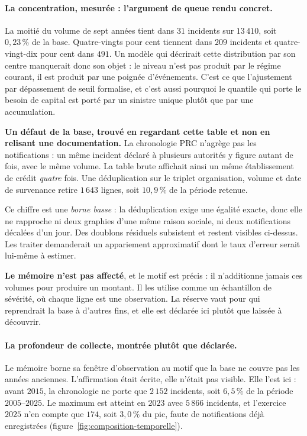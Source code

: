 
\paragraph{La concentration, mesurée : l'argument de queue rendu concret.} La moitié du
volume de sept années tient dans $31$ incidents sur $13\,410$, soit $0{,}23\,\%$ de la
base. Quatre-vingts pour cent tiennent dans $209$ incidents et quatre-vingt-dix pour cent dans
$491$. Un modèle qui décrirait cette distribution par son centre manquerait donc son objet : le
niveau n'est pas produit par le régime courant, il est produit par une poignée d'événements.
C'est ce que l'ajustement par dépassement de seuil formalise, et c'est aussi pourquoi le
quantile qui porte le besoin de capital est porté par un sinistre unique plutôt que par une
accumulation.

\begin{attention}
\textbf{Un défaut de la base, trouvé en regardant cette table et non en relisant une
documentation.} La chronologie PRC n'agrège pas les notifications : un même incident déclaré à
plusieurs autorités y figure autant de fois, avec le même volume. La table brute affichait ainsi
un même établissement de crédit \emph{quatre} fois. Une déduplication sur le triplet
organisation, volume et date de survenance retire $1\,643$ lignes, soit $10{,}9\,\%$ de la
période retenue.

Ce chiffre est une \emph{borne basse} : la déduplication exige une égalité exacte, donc elle ne
rapproche ni deux graphies d'une même raison sociale, ni deux notifications décalées d'un jour.
Des doublons résiduels subsistent et restent visibles ci-dessus. Les traiter demanderait un
appariement approximatif dont le taux d'erreur serait lui-même à estimer.

\textbf{Le mémoire n'est pas affecté}, et le motif est précis : il n'additionne jamais ces
volumes pour produire un montant. Il les utilise comme un échantillon de sévérité, où chaque
ligne est une observation. La réserve vaut pour qui reprendrait la base à d'autres fins, et elle
est déclarée ici plutôt que laissée à découvrir.
\end{attention}

\paragraph{La profondeur de collecte, montrée plutôt que déclarée.} Le mémoire borne sa fenêtre
d'observation au motif que la base ne couvre pas les années anciennes. L'affirmation était
écrite, elle n'était pas visible. Elle l'est ici : avant $2015$, la chronologie ne porte que
$2\,152$ incidents, soit $6{,}5\,\%$ de la période $2005$--$2025$. Le maximum est atteint en
$2023$ avec $5\,866$ incidents, et l'exercice $2025$ n'en compte que $174$, soit $3{,}0\,\%$ du
pic, faute de notifications déjà enregistrées (figure~\ref{fig:composition-temporelle}).

